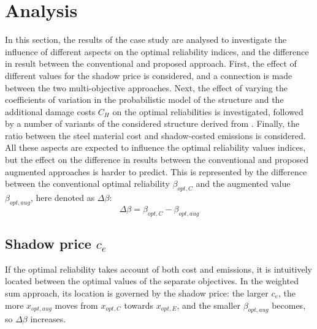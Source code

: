 \newpage
\section{Analysis}

In this section, the results of the case study are analysed to investigate the influence of different aspects on the optimal reliability indices, and the difference in result between the conventional and proposed approach.
First, the effect of different values for the shadow price is considered, and a connection is made between the two multi-objective approaches.
Next, the effect of varying the coefficients of variation in the probabilistic model of the structure and the additional damage costs $C_H$ on the optimal reliabilities is investigated, followed by a number of variants of the considered structure derived from \cite{Hingorani2023SustainabilityDesign}.
Finally, the ratio between the steel material cost and shadow-costed emissions is considered.
All these aspects are expected to influence the optimal reliability values indices, but the effect on the difference in results between the conventional and proposed augmented approaches is harder to predict.
This is represented by the difference between the conventional optimal reliability $\beta_{opt,C}$ and the augmented value $\beta_{opt,aug}$, here denoted as $\Delta \beta$:
\begin{equation}
    \label{eqn:delta_beta}
    \Delta \beta = \beta_{opt,C} - \beta_{opt,aug}
\end{equation}

\subsection{Shadow price $c_e$}

If the optimal reliability takes account of both cost and emissions, it is intuitively located between the optimal values of the separate objectives.
In the weighted sum approach, its location is governed by the shadow price: the larger $c_e$, the more $x_{opt,aug}$ moves from $x_{opt,C}$ towards $x_{opt,E}$, and the smaller $\beta_{opt,aug}$ becomes, so $\Delta \beta$ increases.

